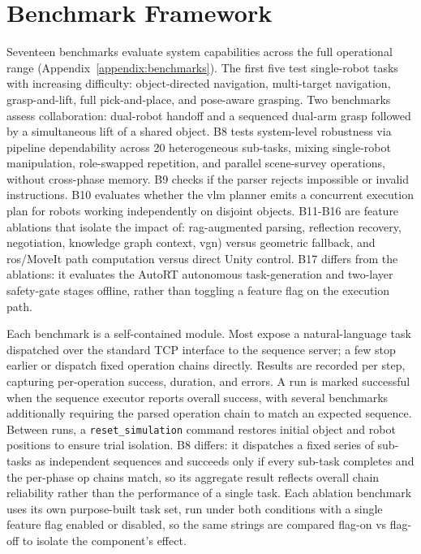 \documentclass[
     12pt,
     a4paper,
     BCOR=10mm,
     DIV=14,
     listof=totoc,
     bibliography=totoc,
     parskip,
     twoside,
     headsepline
     ]{scrreprt}
\begin{document}
\section{Benchmark Framework}\label{sec:benchmark-framework}
Seventeen benchmarks evaluate system capabilities across the full operational range (Appendix~\ref{appendix:benchmarks}). The first five test single-robot tasks with increasing difficulty: object-directed navigation, multi-target navigation, grasp-and-lift, full pick-and-place, and pose-aware grasping. Two benchmarks assess collaboration: dual-robot handoff and a sequenced dual-arm grasp followed by a simultaneous lift of a shared object. B8 tests system-level robustness via pipeline dependability across 20 heterogeneous sub-tasks, mixing single-robot manipulation, role-swapped repetition, and parallel scene-survey operations, without cross-phase memory. B9 checks if the parser rejects impossible or invalid instructions. B10 evaluates whether the \gls{vlm} planner emits a concurrent execution plan for robots working independently on disjoint objects. B11-B16 are feature ablations that isolate the impact of: \gls{rag}-augmented parsing, reflection recovery, negotiation, knowledge graph context, \gls{vgn}) versus geometric fallback, and \gls{ros}/MoveIt path computation versus direct Unity control. B17 differs from the ablations: it evaluates the AutoRT autonomous task-generation and two-layer safety-gate stages offline, rather than toggling a feature flag on the execution path.

Each benchmark is a self-contained module. Most expose a natural-language task dispatched over the standard TCP interface to the sequence server; a few stop earlier or dispatch fixed operation chains directly. Results are recorded per step, capturing per-operation success, duration, and errors. A run is marked successful when the sequence executor reports overall success, with several benchmarks additionally requiring the parsed operation chain to match an expected sequence. Between runs, a \texttt{reset\_simulation} command restores initial object and robot positions to ensure trial isolation. B8 differs: it dispatches a fixed series of sub-tasks as independent sequences and succeeds only if every sub-task completes and the per-phase op chains match, so its aggregate result reflects overall chain reliability rather than the performance of a single task. Each ablation benchmark uses its own purpose-built task set, run under both conditions with a single feature flag enabled or disabled, so the same strings are compared flag-on vs flag-off to isolate the component's effect.
\end{document}
